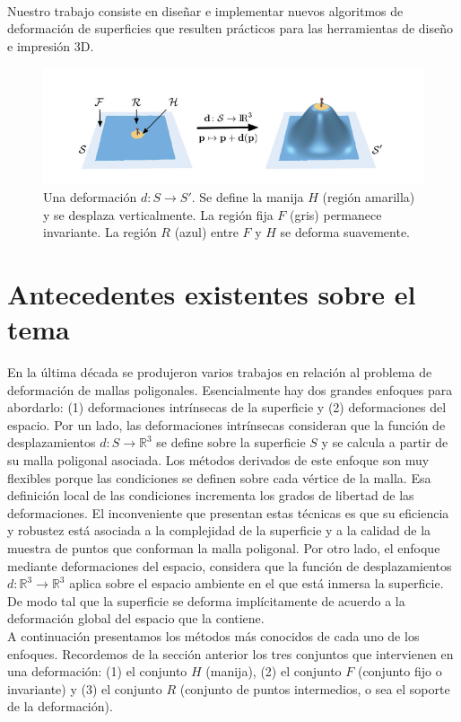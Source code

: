 \documentclass{article}
\begin{document}
\

Nuestro trabajo consiste en diseñar e implementar nuevos algoritmos de 
deformación de superficies que resulten prácticos para las herramientas 
de diseño e impresión 3D.

\begin{figure}
	\includegraphics[scale=.5]{deformacion.png} %
	\caption{Una deformación $d: S \rightarrow S'$. Se define la manija 
	$H$ (región amarilla) y se desplaza verticalmente. La región 
	fija $F$ (gris) permanece invariante. La región $R$ (azul) entre $F$ 
	y $H$ se deforma suavemente.}%
	\label{fig:def} %
\end{figure}

\section{Antecedentes existentes sobre el tema}

En la última década se produjeron varios trabajos en relación al problema 
de deformación de mallas poligonales. Esencialmente hay dos grandes enfoques 
para abordarlo: (1) deformaciones intrínsecas de la superficie y (2) deformaciones 
del espacio. Por un lado, las deformaciones intrínsecas consideran que la 
función de desplazamientos $d: S \rightarrow \mathbb{R}^3$ se define sobre 
la superficie $S$ y se calcula a partir de su malla poligonal asociada. Los 
métodos derivados de este enfoque son muy flexibles porque las condiciones 
se definen sobre cada vértice de la malla. Esa definición local de las 
condiciones incrementa los grados de libertad de las deformaciones. El inconveniente 
que presentan estas técnicas es que su eficiencia y robustez está asociada 
a la complejidad de la superficie y a la calidad de la muestra de puntos 
que conforman la malla poligonal. Por otro lado, el enfoque mediante deformaciones 
del espacio, considera que la función de desplazamientos $d: \mathbb{R}^3 
\rightarrow \mathbb{R}^3$ aplica sobre el espacio ambiente en el que está 
inmersa la superficie. De modo tal que la superficie se deforma implícitamente 
de acuerdo a la deformación global del espacio que la contiene. \\
A continuación presentamos los métodos más conocidos de cada uno de los  
enfoques. Recordemos de la sección anterior los tres conjuntos que intervienen 
en una deformación: (1) el conjunto $H$ (manija), (2) el conjunto $F$ (conjunto 
fijo o invariante) y (3) el conjunto $R$ (conjunto de puntos intermedios, 
o sea el soporte de la deformación).
\end{document}
